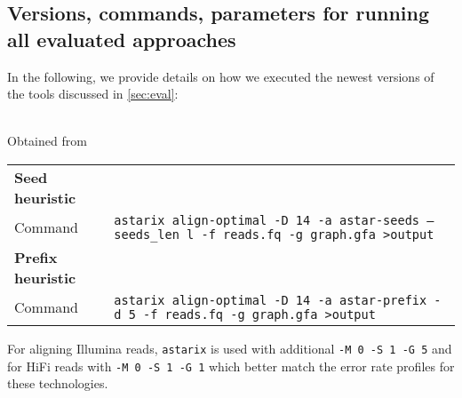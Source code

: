 \subsection{Versions, commands, parameters for running all evaluated approaches} \label{sec:commands}
In the following, we provide details on how we executed the newest versions of
the tools discussed in \cref{sec:eval}:

 \\
\noindent Obtained from \astarixurl \\
\noindent
\begin{tabular}{lp{9.5cm}}
	\textbf{Seed heuristic} & \\
	\quad Command & \texttt{astarix align-optimal -D 14 -a astar-seeds --seeds\_len l -f reads.fq -g graph.gfa >output} \\
	\textbf{Prefix heuristic} & \\
	\quad Command & \texttt{astarix align-optimal -D 14 -a astar-prefix -d 5 -f reads.fq -g graph.gfa >output} \\
\end{tabular}

For aligning Illumina reads, \texttt{astarix} is used with additional \texttt{-M
0 -S 1 -G 5} and for HiFi reads with \texttt{-M 0 -S 1 -G 1} which better match
the error rate profiles for these technologies.

